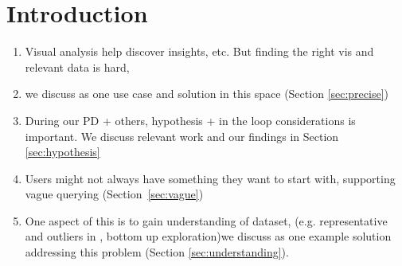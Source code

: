 \section{Introduction}

\begin{enumerate}
	\item Visual analysis help discover insights, etc. But finding the right vis and relevant data is hard, 
	\item  we discuss \zv as one use case and solution in this space (Section \ref{sec:precise})
	\item During our PD + others, hypothesis + in the loop considerations is important. We discuss relevant work and our findings in Section \ref{sec:hypothesis}
	\item Users might not always have something they want to start with, supporting vague querying (Section~\ref{sec:vague})
	\item  One aspect of this is to gain understanding of dataset, (e.g. representative and outliers in \zv, bottom up exploration)we discuss \sbd as one example solution addressing this problem (Section \ref{sec:understanding}).
\end{enumerate}